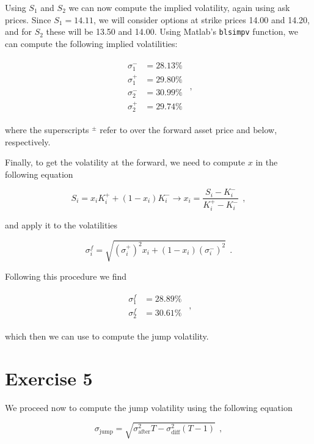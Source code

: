 \documentclass[8 pt]{article}
\begin{document}
\begin{multicols*}{2}
Using $S_1$ and $S_2$ we can now compute the implied volatility, again using ask prices. Since $S_1=14.11$, we will consider options at strike prices 14.00 and 14.20, and for $S_2$ these will be 13.50 and 14.00. Using Matlab's \texttt{blsimpv} function, we can compute the following implied volatilities:

\begin{align*}
  \begin{split}
    \sigma_1^- &= 28.13 \% \\
    \sigma_1^+ &= 29.80 \% \\
    \sigma_2^- &= 30.99 \% \\
    \sigma_2^+ &= 29.74 \%
  \end{split} ~~,
\end{align*}

where the superscripts $^\pm$ refer to over the forward asset price and below, respectively.

Finally, to get the volatility at the forward, we need to compute $x$ in the following equation

\begin{equation*}
  S_i = x_i K_i^+ + (1 - x_i) K_i^- \longrightarrow x_i = \frac{S_i - K_i^-}{K_i^+ - K_i^-} ~~,
\end{equation*}

and apply it to the volatilities

\begin{equation*}
  \sigma_i^f = \sqrt{(\sigma_i^+)^2 x_i + (1 - x_i) (\sigma_i^-)^2} ~~.
\end{equation*}

Following this procedure we find

\begin{align*}
  \begin{split}
    \sigma_1^f &= 28.89 \% \\
    \sigma_2^f &= 30.61 \%
  \end{split} ~~,
\end{align*}

which then we can use to compute the jump volatility.

\section{Exercise 5}

We proceed now to compute the jump volatility using the following equation

\begin{equation*}
  \sigma_{\text{jump}} = \sqrt{\sigma_{\text{after}}^2 T - \sigma_{\text{diff}}^2 (T-1)} ~~,
\end{equation*}


\end{multicols*}
\end{document}
